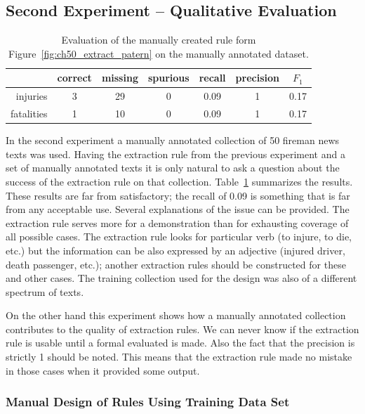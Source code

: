 \subsection{Second Experiment -- Qualitative Evaluation}


\begin{table}
	\centering
	\begin{tabular}{|r|c|c|c|c|c|c|}
		\hline
		 & correct & missing & spurious & recall & precision & $F_1$\\
		\hline
		injuries & 3 & 29 & 0 & 0.09 & 1 & 0.17\\
		\hline
		fatalities & 1 & 10 & 0 & 0.09 & 1 & 0.17\\
		\hline
	\end{tabular}
	\caption{Evaluation of the manually created rule form Figure~\ref{fig:ch50_extract_patern} on the manually annotated dataset.}
	\label{tab:ch50_extract_patern_eval}
\end{table}



In the second experiment a manually annotated collection of 50 fireman news texts was used. Having the extraction rule from the previous experiment and a set of manually annotated texts it is only natural to ask a question about the success of the extraction rule on that collection. Table~\ref{tab:ch50_extract_patern_eval} summarizes the results. These results are far from satisfactory; the recall of 0.09 is something that is far from any acceptable use. Several explanations of the issue can be provided. The extraction rule serves more for a demonstration than for exhausting coverage of all possible cases. The extraction rule looks for particular verb (to injure, to die, etc.) but the information can be also expressed by an adjective (injured driver, death passenger, etc.); another extraction rules should be constructed for these and other cases. The training collection used for the design was also of a different spectrum of texts.



On the other hand this experiment shows how a manually annotated collection contributes to the quality of extraction rules. We can never know if the extraction rule is usable until a formal evaluated is made. Also the fact that the precision is strictly 1 should be noted. This means that the extraction rule made no mistake in those cases when it provided some output.



\subsubsection{Manual Design of Rules Using Training Data Set}  

